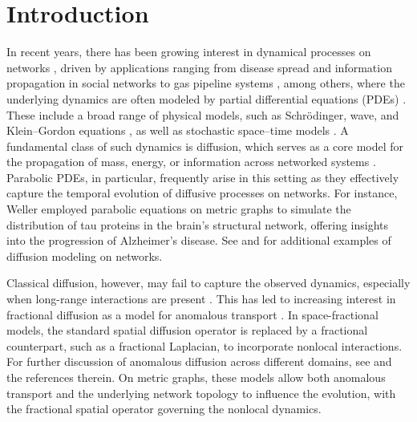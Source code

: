 \documentclass[numbers,webpdf]{ima-authoring-template}%
\theoremstyle{thmstyletwo}%
\numberwithin{equation}{section}
\begin{document}
\maketitle

\section{Introduction}
\label{sec:introduction}
In recent years, there has been growing interest in dynamical processes on networks \cite{Cordoni2017Stochasticreactiondiffusion}, driven by applications ranging from disease spread \cite{Pastor2015Epidemicprocess} and information propagation in social networks \cite{Du2018PDE} to gas pipeline systems \cite{Herty2010Anewmodelforgasflow}, among others, where the underlying dynamics are often modeled by partial differential equations (PDEs) \cite{bottcher2024dynamicalprocessesmetricnetworks}. These include a broad range of physical models, such as Schrödinger, wave, and Klein--Gordon equations \cite{Dutykh2018Wave, Goloshchapova2021Anonlinear, Goodman2019NLSbifurcations, Goodman2025QGlAB}, as well as stochastic space--time models \cite{Cordoni2017Stochasticreactiondiffusion, Kovacs2021Stochastics}. A fundamental class of such dynamics is diffusion, which serves as a core model for the propagation of mass, energy, or information across networked systems \cite{Barrat2008Dynamicalprocess, Jivkov2014Anetworkmodel}. Parabolic PDEs, in particular, frequently arise in this setting as they effectively capture the temporal evolution of diffusive processes on networks. For instance, Weller \cite{kups73182} employed parabolic equations on metric graphs to simulate the distribution of tau proteins in the brain's structural network, offering insights into the progression of Alzheimer’s disease. See \cite[Chapter~11]{Danko2017Modelelements} and \cite{Pastor2015Epidemicprocess, Raj2012Anetworkdiffusionmodel} for additional examples of diffusion modeling on networks. 

Classical diffusion, however, may fail to capture the observed dynamics, especially when long-range interactions are present \cite{Daoud2025classp, Daoud2024Aclass}. This has led to increasing interest in fractional diffusion as a model for anomalous transport \cite{Vazquez2017Themathematical}. In space-fractional models, the standard spatial diffusion operator is replaced by a fractional counterpart, such as a fractional Laplacian, to incorporate nonlocal interactions. For further discussion of anomalous diffusion across different domains, see \cite{Henry2006Anomalous, Miller2006Onthecontrollability, Riascos2014Fractional, Somathilake2018Aspacefractional} and the references therein. On metric graphs, these models allow both anomalous transport and the underlying network topology to influence the evolution, with the fractional spatial operator governing the nonlocal dynamics.
\end{document}
